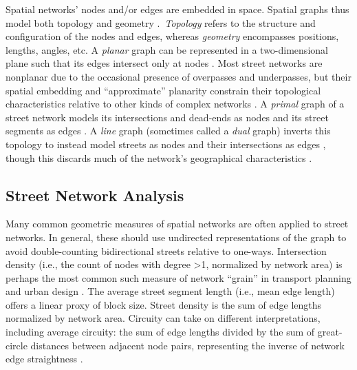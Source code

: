\documentclass[12pt,letterpaper]{article} %
\begin{document}
Spatial networks' nodes and/or edges are embedded in space. Spatial graphs thus model both topology and geometry \citep{fischer_spatial_2014}.\ \textit{Topology} refers to the structure and configuration of the nodes and edges, whereas \textit{geometry} encompasses positions, lengths, angles, etc. A \textit{planar} graph can be represented in a two-dimensional plane such that its edges intersect only at nodes \citep{barthelemy_modeling_2008}. Most street networks are nonplanar due to the occasional presence of overpasses and underpasses, but their spatial embedding and \enquote{approximate} planarity constrain their topological characteristics relative to other kinds of complex networks \citep{boeing_planarity_2020}. A \textit{primal} graph of a street network models its intersections and dead-ends as nodes and its street segments as edges \citep{porta_network_2006-1}. A \textit{line} graph (sometimes called a \textit{dual} graph) inverts this topology to instead model streets as nodes and their intersections as edges \citep{porta_network_2006}, though this discards much of the network's geographical characteristics \citep{ratti_space_2004}.

\subsection{Street Network Analysis}

Many common geometric measures of spatial networks are often applied to street networks. In general, these should use undirected representations of the graph to avoid double-counting bidirectional streets relative to one-ways. Intersection density (i.e., the count of nodes with degree >1, normalized by network area) is perhaps the most common such measure of network \enquote{grain} in transport planning and urban design \citep[e.g.,][]{ewing_travel_2010}. The average street segment length (i.e., mean edge length) offers a linear proxy of block size. Street density is the sum of edge lengths normalized by network area. Circuity can take on different interpretations, including average circuity: the sum of edge lengths divided by the sum of great-circle distances between adjacent node pairs, representing the inverse of network edge straightness \citep{boeing_urban_2019}.
\end{document}
